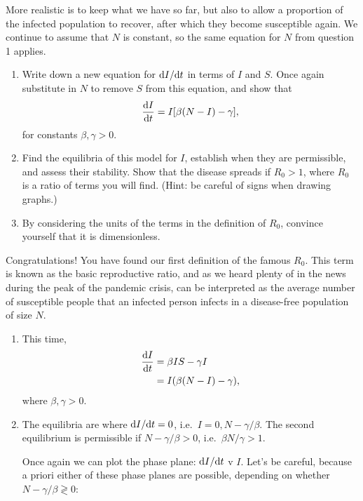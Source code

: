 \documentclass[a4paper,12pt]{article}
\begin{document}
\begin{enumerate}[label={\bf \arabic{*}.\;}, ref={\arabic{*}},itemsep=3ex, left=0ex]
    { %
      More realistic is to keep what we have so far, but also to allow a proportion of the infected population to recover, after which they become susceptible again. We continue to assume that $N$ is constant, so the same equation for $N$ from question 1 applies.
      \begin{enumerate}[label=(\alph*)]
        \item Write down a new equation for $\fd{I}{t}$ in terms of $I$ and $S$. Once again substitute in $N$ to remove $S$ from this equation, and show that
        \begin{equation}
        	\fd{I}{t} = I[\beta(N-I)-\gamma],
        \end{equation}
        for constants $\beta, \gamma >0$.
        \item Find the equilibria of this model for $I$, establish when they are permissible, and assess their stability. Show that the disease spreads if $R_0 > 1$, where $R_0$ is a ratio of terms you will find. (Hint: be careful of signs when drawing graphs.)
        \item By considering the units of the terms in the definition of $R_0$, convince yourself that it is dimensionless.
      \end{enumerate}
      Congratulations! You have found our first definition of the famous $R_0$. This term is known as the basic reproductive ratio, and as we heard plenty of in the news during the peak of the pandemic crisis, can be interpreted as the average number of susceptible people that an infected person infects in a disease-free population of size $N$.
    }
    { %
      \begin{enumerate}[label=(\alph*)]
        \item This time,
          \begin{align}
            \fd{I}{t} &= \beta I S - \gamma I\\
            &= I(\beta(N-I) - \gamma),
          \end{align}
          where $\beta,\gamma > 0$.
        \item The equilibria are where $\fd{I}{t} = 0$, i.e.\ $I = 0, N-\gamma/\beta$. The second equilibrium is permissible if $N-\gamma/\beta > 0$, i.e.\ $\beta N/\gamma > 1$.


          Once again we can plot the phase plane: $\fd{I}{t}$ v $I$. Let's be careful, because a priori either of these phase planes are possible, depending on whether $N-\gamma/\beta \gtrless 0$:


\end{enumerate}}
\end{enumerate}
\end{document}

